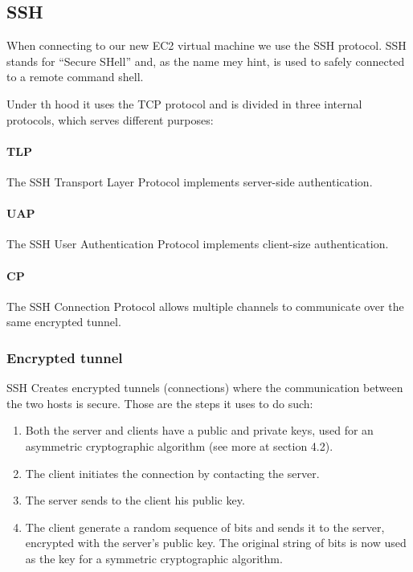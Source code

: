 \documentclass{article}
\begin{document}
\subsection{SSH}

When connecting to our new EC2 virtual machine we use the SSH protocol. SSH stands for ``Secure SHell'' and, as the name mey hint, is used to safely connected to a remote command shell.

Under th hood it uses the TCP protocol and is divided in three internal protocols, which serves different purposes:

\paragraph{TLP}
The SSH Transport Layer Protocol implements server-side authentication.

\paragraph{UAP}
The SSH User Authentication Protocol implements client-size authentication.

\paragraph{CP}
The SSH Connection Protocol allows multiple channels to communicate over the same
encrypted tunnel.

\subsubsection{Encrypted tunnel}
SSH Creates encrypted tunnels (connections) where the communication between the two hosts is secure. Those are the steps it uses to do such:
\begin{enumerate}
    \item Both the server and clients have a public and private keys, used for an asymmetric
          cryptographic algorithm (see more at section 4.2).
    \item The client initiates the connection by contacting the server.
    \item The server sends to the client his public key.
    \item The client generate a random sequence of bits and sends it to the server,
          encrypted with the server's public key. The original string of bits is now used
          as the key for a symmetric cryptographic algorithm.
\end{enumerate}
\end{document}
